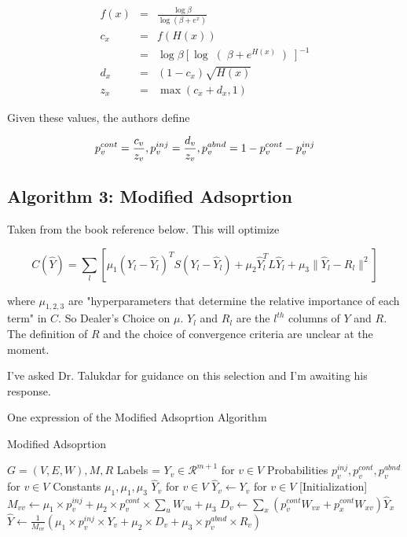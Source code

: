 \documentclass{article}
\begin{document}
\begin{eqnarray}
f(x) &=& \frac{\log \beta}{\log(\beta + e^{x})} \\ 
c_x &=& f(H(x)) \\
&=& \log \beta \left[ \log \right( \beta + e^{H(x)} \left)\right]^{-1} \\
d_x &=& (1-c_x) \sqrt{H(x)} \\
z_x &=& \max( c_x + d_x, 1)
\end{eqnarray}

Given these values, the authors define

\[
p_v^{cont} = \frac{c_v}{z_v}, \vspace{1mm} p_v^{inj} = \frac{d_v}{z_v}, \vspace{1mm} p_v^{abnd} = 1-p_v^{cont}  - p_v^{inj}
\]

\subsection{Algorithm 3: Modified Adsoprtion}

Taken from the book reference below.  This will optimize

\[
C(\hat Y) = \sum_l \left [ \mu_1 \left(Y_l - \hat Y_l \right)^T S\left(Y_l -\hat Y_l\right) + \mu_2 \hat Y_l^T L \hat Y_l + \mu_3 \| \hat Y_l - R_l \|^2 \right]
\]

where $\mu_{1,2,3}$ are "hyperparameters that determine the relative importance of each term" in $C$.  So Dealer's Choice on $\mu$. $Y_l$ and $R_l$ are the $l^{th}$ columns of $Y$ and $R$.   The definition of $R$  and the choice of convergence criteria are unclear at the moment. 

I've asked Dr. Talukdar for guidance on this selection and I'm awaiting his response. 

\begin{algorithm}
\caption{One expression of the Modified Adsoprtion Algorithm}
\begin{algorithmic}[1]
\caption{Modified Adsoprtion}\label{euclid}
	  \State $G = (V,E,W), M, R$
	  \State Labels = $Y_v \in \mathcal{R}^{m+1}$ for $v \in V$
	  \State Probabilities $p_v^{inj}, p_v^{cont}, p_v^{abnd}$ for $v \in V$
	  \State Constants $\mu_1, \mu_1, \mu_3$
	\EndProcedure
	  \State $\hat Y_v$ for $v \in V$
	\EndProcedure
	  \State $\hat Y_v \gets Y_v$ for $v \in V$ [Initialization]
	  \State $M_{vv} \gets \mu_1 \times p_v^{inj} + \mu_2 \times p_v^{cont} \times \sum_u W_{vu} + \mu_3$
	  \State $D_v \gets \sum_x \left(p_v^{cont} W_{vx} + p_x^{cont} W_{xv}\right) \hat Y_x $
	    \State $\hat Y \gets \frac{1}{M_{vv}} \left(\mu_1 \times p_v^{inj} \times Y_v + \mu_2 \times D_v + \mu_3 \times p_v^{abnd} \times R_v \right) $ 
	  \EndFor
	\EndWhile
	\EndProcedure
\end{algorithmic}
\end{algorithm}
\end{document}
